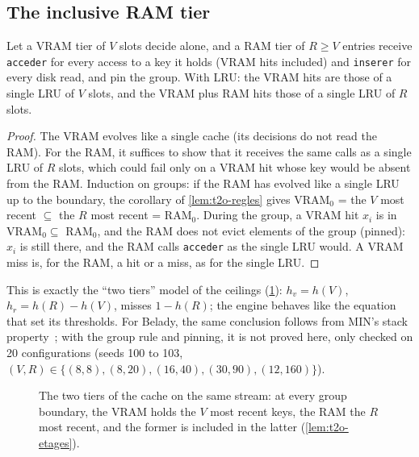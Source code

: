 \subsection{The inclusive RAM tier}

\begin{lemme}\label{lem:t2o-etages}
Let a VRAM tier of $V$ slots decide alone, and a RAM tier of $R \ge V$ entries receive \texttt{acceder} for every access to a key it holds (VRAM hits included) and \texttt{inserer} for every disk read, and pin the group. With LRU: the VRAM hits are those of a single LRU of $V$ slots, and the VRAM plus RAM hits those of a single LRU of $R$ slots.
\end{lemme}

\begin{proof}
The VRAM evolves like a single cache (its decisions do not read the RAM). For the RAM, it suffices to show that it receives the same calls as a single LRU of $R$ slots, which could fail only on a VRAM hit whose key would be absent from the RAM. Induction on groups: if the RAM has evolved like a single LRU up to the boundary, the corollary of \cref{lem:t2o-regles} gives VRAM$_0$ = the $V$ most recent $\subseteq$ the $R$ most recent = RAM$_0$. During the group, a VRAM hit $x_i$ is in VRAM$_0 \subseteq$ RAM$_0$, and the RAM does not evict elements of the group (pinned): $x_i$ is still there, and the RAM calls \texttt{acceder} as the single LRU would. A VRAM miss is, for the RAM, a hit or a miss, as for the single LRU.
\end{proof}

This is exactly the \enquote{two tiers} model of the ceilings (\cref{fig:t2o-etages}): $h_v = h(V)$, $h_r = h(R) - h(V)$, misses $1 - h(R)$; the engine behaves like the equation that set its thresholds. For Belady, the same conclusion follows from MIN's stack property~\cite{mattson1970}; with the group rule and pinning, it is not proved here, only checked on 20 configurations (seeds 100 to 103, $(V, R) \in \{(8, 8), (8, 20), (16, 40), (30, 90), (12, 160)\}$).

\begin{figure}[ht]
\centering
\SchemaCchEtages
\caption[The two tiers of the cache]{The two tiers of the cache on the same stream: at every group boundary, the VRAM holds the $V$ most recent keys, the RAM the $R$ most recent, and the former is included in the latter (\cref{lem:t2o-etages}).}
\label{fig:t2o-etages}
\end{figure}

